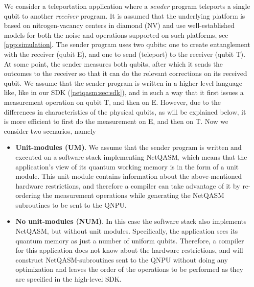 We consider a teleportation application where a \textit{sender} program teleports a single qubit to another \textit{receiver} program.
It is assumed that the underlying platform is based on nitrogen-vacancy centers in diamond (NV) and use well-established models for both the noise and operations supported on such platforms, see \cref{app:simulation}.
The sender program uses two qubits: one to create entanglement with the receiver (qubit E), and one to send (teleport) to the receiver (qubit T).
At some point, the sender measures both qubits, after which it sends the outcomes to the receiver so that it can do the relevant corrections on its received qubit.
We assume that the sender program is written in a higher-level language like, like in our SDK (\cref{netqasm:sec:sdk}), and in such a way that it first issues a measurement operation on qubit T, and then on E. However, due to the differences in characteristics of the physical qubits, as will be explained below, it is more efficient to first do the measurement on E, and then on T. Now we consider two scenarios, namely
\begin{itemize}
  \item \textbf{Unit-modules (UM)}.
        We assume that the sender program is written and executed on a software stack implementing \ac{NetQASM}, which means that the application's view of its quantum working memory is in the form of a unit module.
        This unit module contains information about the above-mentioned hardware restrictions, and therefore a compiler can take advantage of it by re-ordering the measurement operations while generating the \ac{NetQASM} subroutines to be sent to the \ac{QNPU}.
  \item \textbf{No unit-modules (NUM)}.
        In this case the software stack also implements \ac{NetQASM}, but without unit modules.
        Specifically, the application sees its quantum memory as just a number of uniform qubits.
        Therefore, a compiler for this application does not know about the hardware restrictions, and will construct \ac{NetQASM}-subroutines sent to the \ac{QNPU} without doing any optimization and leaves the order of the operations to be performed as they are specified in the high-level SDK.
\end{itemize}


